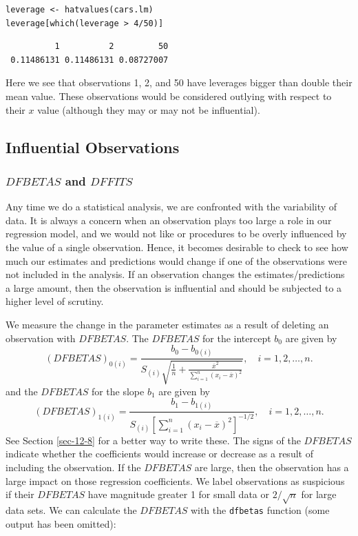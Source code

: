 \documentclass[captions=tableheading]{scrbook}
\begin{document}
\begin{verbatim}
leverage <- hatvalues(cars.lm)
leverage[which(leverage > 4/50)]
\end{verbatim}

\begin{verbatim}
          1          2         50 
 0.11486131 0.11486131 0.08727007
\end{verbatim}

Here we see that observations 1, 2, and 50 have leverages bigger than double their mean value. These observations would be considered outlying with respect to their \(x\) value (although they may or may not be influential).
\subsection{Influential Observations}
\label{sec-11-5-4}
\subsubsection{\(DFBETAS\) and \(DFFITS\)}
\label{sec-11-5-4-1}


Any time we do a statistical analysis, we are confronted with the variability of data. It is always a concern when an observation plays too large a role in our regression model, and we would not like or procedures to be overly influenced by the value of a single observation. Hence, it becomes desirable to check to see how much our estimates and predictions would change if one of the observations were not included in the analysis. If an observation changes the estimates/predictions a large amount, then the observation is influential and should be subjected to a higher level of scrutiny.

We measure the change in the parameter estimates as a result of deleting an observation with \(DFBETAS\). The \(DFBETAS\) for the intercept \(b_{0}\) are given by
\begin{equation}
(DFBETAS)_{0(i)}=\frac{b_{0}-b_{0(i)}}{S_{(i)}\sqrt{\frac{1}{n}+\frac{\overline{x}^{2}}{\sum_{i=1}^{n}(x_{i}-\overline{x})^{2}}}},\quad i=1,2,\ldots,n.
\end{equation}
and the \(DFBETAS\) for the slope \(b_{1}\) are given by
\begin{equation}
(DFBETAS)_{1(i)}=\frac{b_{1}-b_{1(i)}}{S_{(i)}\left[\sum_{i=1}^{n}(x_{i}-\overline{x})^{2}\right]^{-1/2}},\quad i=1,2,\ldots,n.
\end{equation}
See Section \ref{sec-12-8} for a better way to write these. The signs of the \(DFBETAS\) indicate whether the coefficients would increase or decrease as a result of including the observation. If the \(DFBETAS\) are large, then the observation has a large impact on those regression coefficients. We label observations as suspicious if their \(DFBETAS\) have magnitude greater 1 for small data or \(2/\sqrt{n}\) for large data sets.
We can calculate the \(DFBETAS\) with the \texttt{dfbetas} function (some output has been omitted):
\end{document}
